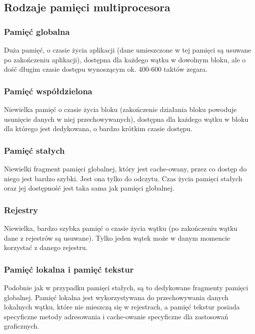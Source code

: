 \subsection{Rodzaje pamięci multiprocesora}
	\subsubsection{Pamięć globalna}
		Duża pamięć, o czasie życia aplikacji (dane umieszczone w tej pamięci są usuwane po zakończeniu aplikacji), dostępna dla każdego wątku w dowolnym bloku, ale o dość długim czasie dostępu wynoszącym ok. 400-600 taktów zegara.
	\subsubsection{Pamięć współdzielona}
		Niewielka pamięć o czasie życia bloku (zakończenie działania bloku powoduje usunięcie danych w niej przechowywanych), dostępna dla każdego wątku w bloku dla którego jest dedykowana, o bardzo krótkim czasie dostępu.
	\subsubsection{Pamięć stałych}
		Niewielki fragment pamięci globalnej, który jest cache-owany, przez co dostęp do niego jest bardzo szybki. Jest ona tylko do odczytu. Czas życia pamięci stałych oraz jej dostępność jest taka sama jak pamięci globalnej.
	\subsubsection{Rejestry}
		Niewielka, bardzo szybka pamięć o czasie życia wątku (po zakończeniu wątku dane z rejestrów są usuwane). Tylko jeden wątek może w danym momencie korzystać z danego rejestru.
	\subsubsection{Pamięć lokalna i pamięć tekstur}
		Podobnie jak w przypadku pamięci stałych, są to dedykowane fragmenty pamięci globalnej. Pamięć lokalna jest wykorzystywana do przechowywania danych lokalnych wątku, które nie mieszczą się w rejestrach, a pamięć tekstur posiada specyficzne metody adresowania i cache-owanie specyficzne dla zastosowań graficznych.
\vfill
